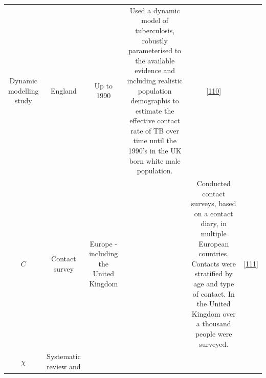 \documentclass[11pt,twoside]{bristolthesis}
\begin{document}
\begin{longtable}[]{@{}cccccc@{}}
\begin{minipage}[t]{0.10\columnwidth}
  Dynamic
  modelling
  study\strut
  \end{minipage} & \begin{minipage}[t]{0.07\columnwidth}\centering
  England\strut
  \end{minipage} & \begin{minipage}[t]{0.07\columnwidth}\centering
  Up to
  1990\strut
  \end{minipage} & \begin{minipage}[t]{0.27\columnwidth}\centering
  Used a dynamic model of tuberculosis,
  robustly parameterised to the available
  evidence and including realistic
  population demographis to estimate the
  effective contact rate of TB over time
  until the 1990's in the UK born white
  male population.\strut
  \end{minipage} & \begin{minipage}[t]{0.11\columnwidth}\centering
  {[}\protect\hyperlink{ref-Vynnycky1999}{110}{]}\strut
  \end{minipage}\tabularnewline
  \begin{minipage}[t]{0.21\columnwidth}\centering
  \(C\)\strut
  \end{minipage} & \begin{minipage}[t]{0.10\columnwidth}\centering
  Contact
  survey\strut
  \end{minipage} & \begin{minipage}[t]{0.07\columnwidth}\centering
  Europe -
  including
  the
  United
  Kingdom\strut
  \end{minipage} & \begin{minipage}[t]{0.07\columnwidth}\centering
  2005\strut
  \end{minipage} & \begin{minipage}[t]{0.27\columnwidth}\centering
  Conducted contact surveys, based on a
  contact diary, in multiple European
  countries. Contacts were stratified by
  age and type of contact. In the United
  Kingdom over a thousand people were
  surveyed.\strut
  \end{minipage} & \begin{minipage}[t]{0.11\columnwidth}\centering
  {[}\protect\hyperlink{ref-Mossong2008}{111}{]}\strut
  \end{minipage}\tabularnewline
  \begin{minipage}[t]{0.21\columnwidth}\centering
  \(\chi\)\strut
  \end{minipage} & \begin{minipage}[t]{0.10\columnwidth}\centering
  Systematic
  review and

\end{minipage}
\end{longtable}
\end{document}
